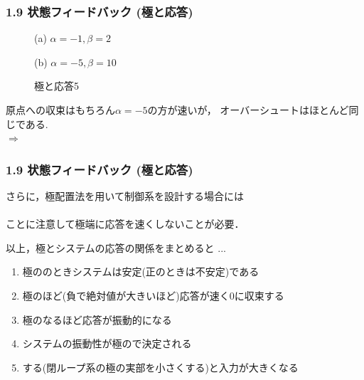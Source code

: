 \begin{frame}[t]
\frametitle{1.9 状態フィードバック (極と応答)}
\begin{figure}[t!]
 \begin{minipage}{0.5\textwidth}
  \begin{center}
   \scalebox{.8}{}
   (a) $\alpha = -1, \beta = 2$
  \end{center}
 \end{minipage}%
 \begin{minipage}{0.5\textwidth}
  \begin{center}
   \scalebox{.8}{}
   (b) $\alpha = -5, \beta = 10$
  \end{center}
 \end{minipage}
 \caption{極と応答5}
 \label{fig_pole910}
\end{figure}
原点への収束はもちろん$\alpha = -5$の方が速いが，
オーバーシュートはほとんど同じである.\\
$\Longrightarrow$ 

\end{frame}


\begin{frame}[t]
\frametitle{1.9 状態フィードバック (極と応答)}
さらに，極配置法を用いて制御系を設計する場合には\\
\\
ことに注意して極端に応答を速くしないことが必要．

\vspace{5mm}

以上，極とシステムの応答の関係をまとめると ...
\begin{enumerate}
  \item 極ののときシステムは安定(正のときは不安定)である
  \item 極のほど(負で絶対値が大きいほど)応答が速く0に収束する
  \item 極のなるほど応答が振動的になる
  \item システムの振動性が極ので決定される
  \item {}する(閉ループ系の極の実部を小さくする)と入力が大きくなる
\end{enumerate}

\end{frame}


